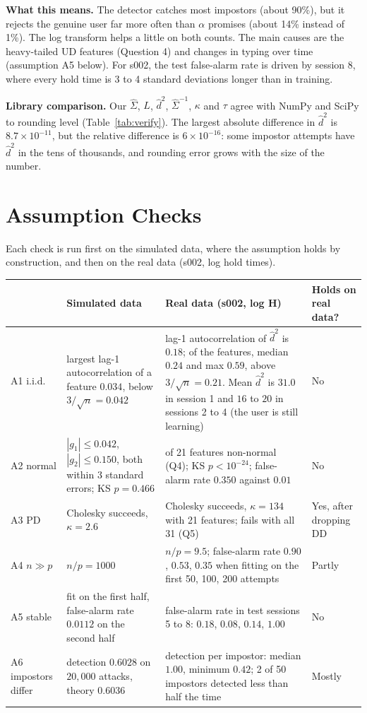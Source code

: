 \documentclass[11pt]{article}
\newcommand{\hSigma}{\hat{\Sigma}}
\theoremstyle{plain}
\begin{document}
\textbf{What this means.} The detector catches most impostors (about 90\%), but it
rejects the genuine user far more often than $\alpha$ promises (about 14\% instead of
1\%). The log transform helps a little on both counts. The main causes are the
heavy-tailed UD features (Question 4) and changes in typing over time
(assumption A5 below). For s002, the test false-alarm rate is driven by session 8,
where every hold time is 3 to 4 standard deviations longer than in training.

\textbf{Library comparison.} Our $\hSigma$, $L$, $\hat d^2$, $\hSigma^{-1}$, $\kappa$ and
$\tau$ agree with NumPy and SciPy to rounding level (Table~\ref{tab:verify}). The
largest absolute difference in $\hat d^2$ is $8.7\times10^{-11}$, but the relative
difference is $6\times10^{-16}$: some impostor attempts have $\hat d^2$ in the tens of
thousands, and rounding error grows with the size of the number.

\section{Assumption Checks}\label{sec:assump}
Each check is run first on the simulated data, where the assumption holds by
construction, and then on the real data (s002, log hold times).

\begin{table}[H]
\centering\small
\begin{tabularx}{\linewidth}{@{}l>{\raggedright\arraybackslash}X>{\raggedright\arraybackslash}X>{\raggedright\arraybackslash}p{1.3cm}@{}}
\toprule
 & Simulated data & Real data (s002, log H) & Holds on real data?\\
\midrule
A1 i.i.d. & largest lag-1 autocorrelation of a feature $0.034$, below $3/\sqrt n=0.042$ &
lag-1 autocorrelation of $\hat d^2$ is $0.18$; of the features, median $0.24$ and max
$0.59$, above $3/\sqrt n=0.21$. Mean $\hat d^2$ is $31.0$ in session 1 and $16$ to $20$
in sessions 2 to 4 (the user is still learning) & No\\
A2 normal & $|g_1|\le0.042$, $|g_2|\le0.150$, both within 3 standard errors; KS
$p=0.466$ & 11 of 21 features non-normal (Q4); KS $p<10^{-24}$; false-alarm rate
$0.350$ against $0.01$ & No\\
A3 PD & Cholesky succeeds, $\kappa=2.6$ & Cholesky succeeds, $\kappa=134$ with 21
features; fails with all 31 (Q5) & Yes, after dropping DD\\
A4 $n\gg p$ & $n/p=1000$ & $n/p=9.5$; false-alarm rate $0.90$, $0.53$, $0.35$ when fitting
on the first 50, 100, 200 attempts & Partly\\
A5 stable & fit on the first half, false-alarm rate $0.0112$ on the second half &
false-alarm rate in test sessions 5 to 8: $0.18$, $0.08$, $0.14$, $1.00$ & No\\
A6 impostors differ & detection $0.6028$ on $20{,}000$ attacks, theory $0.6036$ &
detection per impostor: median $1.00$, minimum $0.42$; 2 of 50 impostors detected less
than half the time & Mostly\\
\bottomrule
\end{tabularx}
\end{table}
\end{document}
